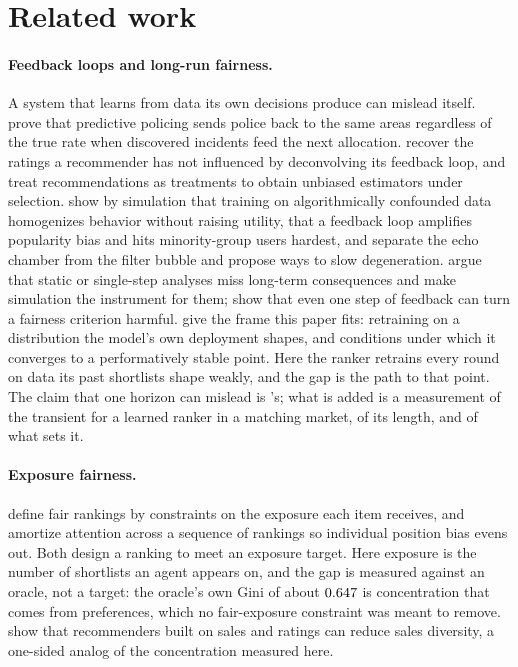 
\section{Related work}
\label{sec:related}

\paragraph{Feedback loops and long-run fairness.} A system that learns from data
its own decisions produce can mislead itself. \citet{ensign2018} prove that
predictive policing sends police back to the same areas regardless of the true
rate when discovered incidents feed the next allocation. \citet{sinha2016}
recover the ratings a recommender has not influenced by deconvolving its feedback
loop, and \citet{schnabel2016} treat recommendations as treatments to obtain
unbiased estimators under selection. \citet{chaney2018} show by simulation that
training on algorithmically confounded data homogenizes behavior without raising
utility, \citet{mansoury2020} that a feedback loop amplifies popularity bias and
hits minority-group users hardest, and \citet{jiang2019} separate the echo chamber
from the filter bubble and propose ways to slow degeneration. \citet{damour2020}
argue that static or single-step analyses miss long-term consequences and make
simulation the instrument for them; \citet{liu2018} show that even one step of
feedback can turn a fairness criterion harmful. \citet{perdomo2020} give the frame
this paper fits: retraining on a distribution the model's own deployment shapes,
and conditions under which it converges to a performatively stable point. Here the
ranker retrains every round on data its past shortlists shape weakly, and the gap
is the path to that point. The claim that one horizon can mislead is
\citet{damour2020}'s; what is added is a measurement of the transient for a
learned ranker in a matching market, of its length, and of what sets it.

\paragraph{Exposure fairness.} \citet{singh2018} define fair rankings by
constraints on the exposure each item receives, and \citet{biega2018} amortize
attention across a sequence of rankings so individual position bias evens out.
Both design a ranking to meet an exposure target. Here exposure is the number of
shortlists an agent appears on, and the gap is measured against an oracle, not a
target: the oracle's own Gini of about $0.647$ is concentration that
comes from preferences, which no fair-exposure constraint was meant to remove.
\citet{fleder2009} show that recommenders built on sales and ratings can reduce
sales diversity, a one-sided analog of the concentration measured here.

